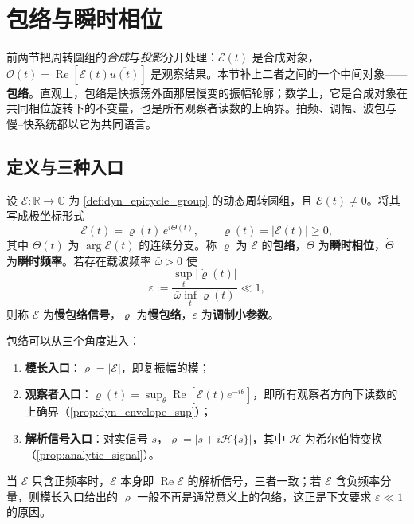 \section{包络与瞬时相位}
\label{sec:dyn_envelope}

前两节把周转圆组的\emph{合成}与\emph{投影}分开处理：$\mathcal E(t)$ 是合成对象，$\mathcal O(t)=\operatorname{Re}[\mathcal E(t)\overline{u(t)}]$ 是观察结果。本节补上二者之间的一个中间对象——\textbf{包络}。直观上，包络是快振荡外面那层慢变的振幅轮廓；数学上，它是合成对象在共同相位旋转下的不变量，也是所有观察者读数的上确界。拍频、调幅、波包与慢–快系统都以它为共同语言。

\subsection{定义与三种入口}

\begin{definition}[包络与瞬时相位]\label{def:dyn_envelope}
设 $\mathcal E:\mathbb R\to\mathbb C$ 为 \cref{def:dyn_epicycle_group} 的动态周转圆组，且 $\mathcal E(t)\neq0$。将其写成极坐标形式
\[
\mathcal E(t)=\varrho(t)\,e^{i\Theta(t)},\qquad \varrho(t)=|\mathcal E(t)|\ge0,
\]
其中 $\Theta(t)$ 为 $\arg\mathcal E(t)$ 的连续分支。称 $\varrho$ 为 $\mathcal E$ 的\textbf{包络}，$\Theta$ 为\textbf{瞬时相位}，$\dot\Theta$ 为\textbf{瞬时频率}。若存在载波频率 $\bar\omega>0$ 使
\[
\varepsilon:=\frac{\sup_{t}|\dot\varrho(t)|}{\bar\omega\inf_{t}\varrho(t)}\ll1,
\]
则称 $\mathcal E$ 为\textbf{慢包络信号}，$\varrho$ 为\textbf{慢包络}，$\varepsilon$ 为\textbf{调制小参数}。
\end{definition}

\begin{remark}[包络的三种入口]\label{rem:dyn_envelope_three_entries}
包络可以从三个角度进入：
\begin{enumerate}[label=(\roman*)]
    \item \textbf{模长入口}：$\varrho=|\mathcal E|$，即复振幅的模；
    \item \textbf{观察者入口}：$\varrho(t)=\sup_{\theta}\operatorname{Re}[\mathcal E(t)e^{-i\theta}]$，即所有观察者方向下读数的上确界（\cref{prop:dyn_envelope_sup}）；
    \item \textbf{解析信号入口}：对实信号 $s$，$\varrho=|s+i\mathcal H\{s\}|$，其中 $\mathcal H$ 为希尔伯特变换（\cref{prop:analytic_signal}）。
\end{enumerate}
当 $\mathcal E$ 只含正频率时，$\mathcal E$ 本身即 $\operatorname{Re}\mathcal E$ 的解析信号，三者一致；若 $\mathcal E$ 含负频率分量，则模长入口给出的 $\varrho$ 一般不再是通常意义上的包络，这正是下文要求 $\varepsilon\ll1$ 的原因。
\end{remark}


